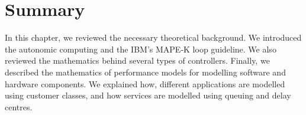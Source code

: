 %
%
%
%
%
%
%
%
%
% 
%
%
%
% 
%



  \section{Summary}  
   In this chapter, we reviewed the necessary theoretical background. We introduced the autonomic computing and the IBM's MAPE-K loop guideline.  We also reviewed the mathematics behind several types of controllers. Finally, we described  the mathematics of performance models for modelling software and hardware  components. We explained how, different applications are modelled using customer classes, and how services are modelled using queuing and delay centres. 
   
   

